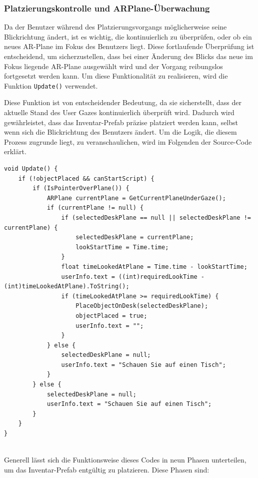 \subsubsection{Platzierungskontrolle und ARPlane-Überwachung}
Da der Benutzer während des Platzierungsvorgangs möglicherweise seine Blickrichtung ändert, ist es wichtig, die kontinuierlich
zu überprüfen, oder ob ein neues AR-Plane im Fokus des Benutzers liegt. Diese fortlaufende Überprüfung ist entscheidend,
um sicherzustellen, dass bei einer Änderung des Blicks das neue im Fokus liegende AR-Plane ausgewählt wird und der Vorgang
reibungslos fortgesetzt werden kann. Um diese Funktionalität zu realisieren, wird die Funktion \texttt{Update()} verwendet.

Diese Funktion ist von entscheidender Bedeutung, da sie sicherstellt, dass der aktuelle Stand des User Gazes kontinuierlich
überprüft wird. Dadurch wird gewährleistet, dass das Inventar-Prefab präzise platziert werden kann, selbst wenn sich die
Blickrichtung des Benutzers ändert. Um die Logik, die diesem Prozess zugrunde liegt, zu veranschaulichen, wird im Folgenden
der Source-Code erklärt.
\begin{lstlisting}[caption={Funktion um Usergaze zu verwenden}, label=code:isPOP]
void Update() {
    if (!objectPlaced && canStartScript) {
        if (IsPointerOverPlane()) {
            ARPlane currentPlane = GetCurrentPlaneUnderGaze();
            if (currentPlane != null) {
                if (selectedDeskPlane == null || selectedDeskPlane != currentPlane) {
                    selectedDeskPlane = currentPlane;
                    lookStartTime = Time.time;
                }
                float timeLookedAtPlane = Time.time - lookStartTime;
                userInfo.text = ((int)requiredLookTime - (int)timeLookedAtPlane).ToString();
                if (timeLookedAtPlane >= requiredLookTime) {
                    PlaceObjectOnDesk(selectedDeskPlane);
                    objectPlaced = true;
                    userInfo.text = "";
                }
            } else {
                selectedDeskPlane = null;
                userInfo.text = "Schauen Sie auf einen Tisch";
            }
        } else {
            selectedDeskPlane = null;
            userInfo.text = "Schauen Sie auf einen Tisch";
        }
    }
}
\end{lstlisting}\\
Generell lässt sich die Funktionsweise dieses Codes in neun Phasen unterteilen, um das Inventar-Prefab entgültig zu platzieren. Diese Phasen sind:

